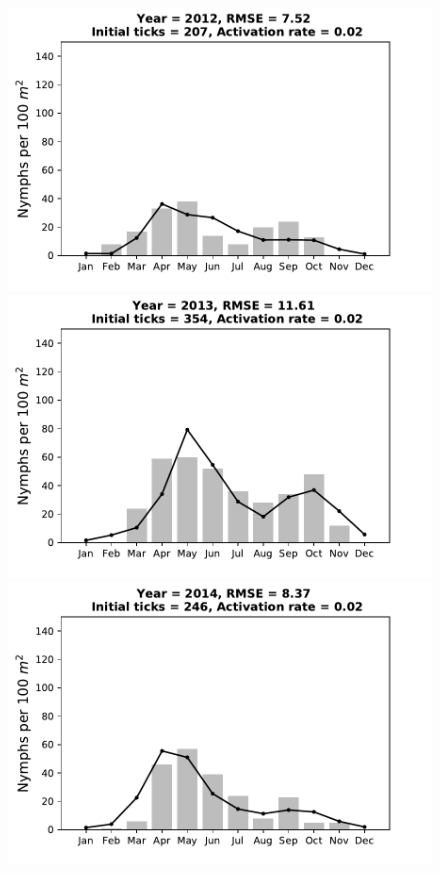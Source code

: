 \documentclass[a4paper, 11pt]{scrartcl}
\begin{document}
\begin{figure}[h!]
\begin{minipage}[c]{0.40\linewidth}
\end{minipage}
\begin{minipage}[c]{0.40\linewidth}
\includegraphics[width=\linewidth]{figures/s1/s1_2012}
\end{minipage}
\begin{minipage}[c]{0.40\linewidth}
\includegraphics[width=\linewidth]{figures/s1/s1_2013}
\end{minipage}
\begin{minipage}[c]{0.40\linewidth}
\includegraphics[width=\linewidth]{figures/s1/s1_2014}

\end{minipage}
\end{figure}
\end{document}
